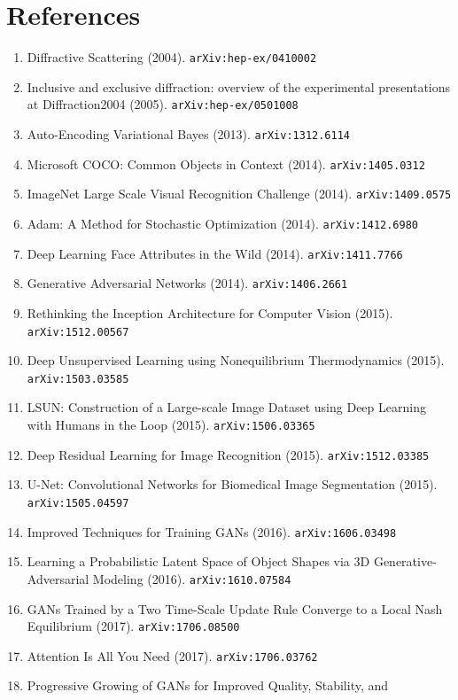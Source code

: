 \documentclass[11pt]{article}
\begin{document}
\section*{References}
\begin{enumerate}\small
  \item Diffractive Scattering (2004). \texttt{arXiv:hep-ex/0410002}
  \item Inclusive and exclusive diffraction: overview of the experimental
  presentations at Diffraction2004 (2005). \texttt{arXiv:hep-ex/0501008}
  \item Auto-Encoding Variational Bayes (2013). \texttt{arXiv:1312.6114}
  \item Microsoft COCO: Common Objects in Context (2014). \texttt{arXiv:1405.0312}
  \item ImageNet Large Scale Visual Recognition Challenge (2014). \texttt{arXiv:1409.0575}
  \item Adam: A Method for Stochastic Optimization (2014). \texttt{arXiv:1412.6980}
  \item Deep Learning Face Attributes in the Wild (2014). \texttt{arXiv:1411.7766}
  \item Generative Adversarial Networks (2014). \texttt{arXiv:1406.2661}
  \item Rethinking the Inception Architecture for Computer Vision (2015). \texttt{arXiv:1512.00567}
  \item Deep Unsupervised Learning using Nonequilibrium Thermodynamics (2015). \texttt{arXiv:1503.03585}
  \item LSUN: Construction of a Large-scale Image Dataset using Deep Learning
  with Humans in the Loop (2015). \texttt{arXiv:1506.03365}
  \item Deep Residual Learning for Image Recognition (2015). \texttt{arXiv:1512.03385}
  \item U-Net: Convolutional Networks for Biomedical Image Segmentation (2015). \texttt{arXiv:1505.04597}
  \item Improved Techniques for Training GANs (2016). \texttt{arXiv:1606.03498}
  \item Learning a Probabilistic Latent Space of Object Shapes via 3D
  Generative-Adversarial Modeling (2016). \texttt{arXiv:1610.07584}
  \item GANs Trained by a Two Time-Scale Update Rule Converge to a Local Nash
  Equilibrium (2017). \texttt{arXiv:1706.08500}
  \item Attention Is All You Need (2017). \texttt{arXiv:1706.03762}
  \item Progressive Growing of GANs for Improved Quality, Stability, and

\end{enumerate}
\end{document}
